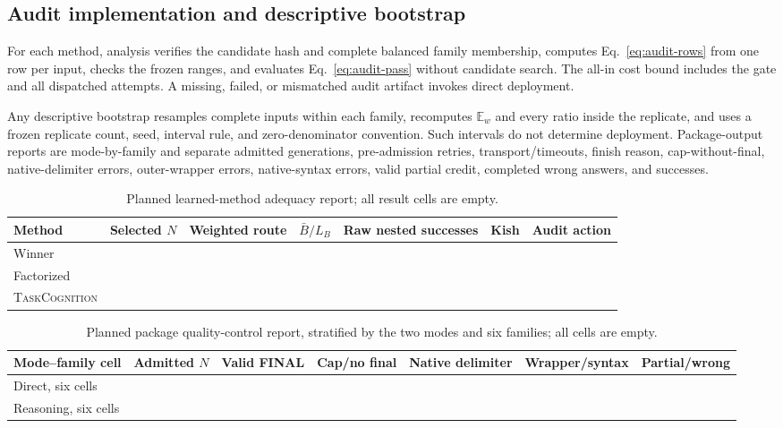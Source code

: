 \documentclass{article}
\newcommand{\TC}{\textsc{TaskCognition}}
\newcommand{\1}{\mathbb{I}}
\newcommand{\Ew}{\mathbb{E}_{w}}
\newcommand{\NA}{\textemdash}
\begin{document}
\subsection{Audit implementation and descriptive bootstrap}
For each method, analysis verifies the candidate hash and complete balanced family membership, computes Eq.~\ref{eq:audit-rows} from one row per input, checks the frozen ranges, and evaluates Eq.~\ref{eq:audit-pass} without candidate search. The all-in cost bound includes the gate and all dispatched attempts. A missing, failed, or mismatched audit artifact invokes direct deployment.

Any descriptive bootstrap resamples complete inputs within each family, recomputes $\Ew$ and every ratio inside the replicate, and uses a frozen replicate count, seed, interval rule, and zero-denominator convention. Such intervals do not determine deployment. Package-output reports are mode-by-family and separate admitted generations, pre-admission retries, transport/timeouts, finish reason, cap-without-final, native-delimiter errors, outer-wrapper errors, native-syntax errors, valid partial credit, completed wrong answers, and successes.

\begin{table}[t]
\caption{Planned learned-method adequacy report; all result cells are empty.}
\centering\scriptsize
\begin{tabular}{lcccccc}
\toprule
Method & Selected $N$ & Weighted route & $\bar B/L_B$ & Raw nested successes & Kish & Audit action \\
\midrule
Winner & \NA & \NA & \NA & \NA & \NA & \NA \\
Factorized & \NA & \NA & \NA & \NA & \NA & \NA \\
\TC{} & \NA & \NA & \NA & \NA & \NA & \NA \\
\bottomrule
\end{tabular}
\end{table}

\begin{table}[t]
\caption{Planned package quality-control report, stratified by the two modes and six families; all cells are empty.}
\centering\scriptsize
\begin{tabular}{lcccccc}
\toprule
Mode--family cell & Admitted $N$ & Valid FINAL & Cap/no final & Native delimiter & Wrapper/syntax & Partial/wrong \\
\midrule
Direct, six cells & \NA & \NA & \NA & \NA & \NA & \NA \\
Reasoning, six cells & \NA & \NA & \NA & \NA & \NA & \NA \\
\bottomrule
\end{tabular}
\end{table}
\end{document}
